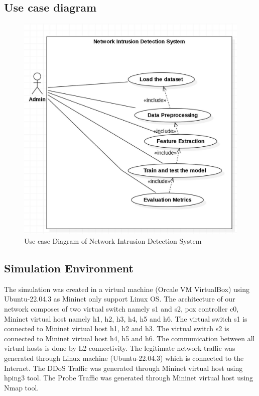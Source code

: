 \subsection{Use case diagram}
\begin{figure}[h]
\begin{center}
	\includegraphics[width=5in]{images/use.jpg} 
	\caption{Use case Diagram of Network Intrusion Detection System} %
	\label{Use case Diagram of Network Intrusion Detection System} %
\end{center}
\end{figure}
\newpage
\subsection{Simulation Environment}
\vspace{-18pt}
The simulation was created in a virtual machine (Orcale VM VirtualBox) using Ubuntu-22.04.3 as Mininet only support Linux OS. The architecture of our network composes of two virtual switch namely s1 and s2, pox controller c0, Mininet virtual host namely h1, h2, h3, h4, h5 and h6. The virtual switch s1 is connected to Mininet virtual host h1, h2 and h3. The virtual switch s2 is connected to Mininet virtual host h4, h5 and h6. The communication between all virtual hosts is done by L2 connectivity. The legitimate network traffic was generated through Linux machine (Ubuntu-22.04.3) which is connected to the Internet. The DDoS Traffic was generated through Mininet virtual host using hping3 tool. The Probe Traffic was generated through Mininet virtual host using Nmap tool.\par 

